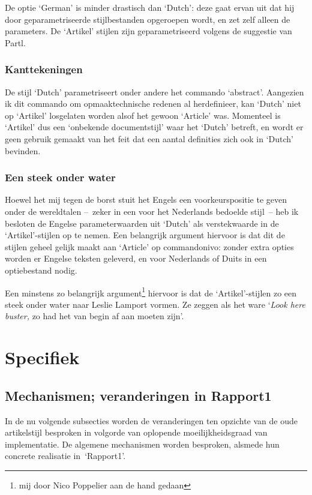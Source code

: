 \documentclass[oldtoc,a4paper,10pt]{rapport3}
\begin{document}
 
De optie `German' is minder drastisch dan `Dutch': deze gaat ervan uit
dat hij door geparametriseerde stijlbestanden opgeroepen wordt, en zet
zelf alleen de parameters.  De `Artikel' stijlen zijn geparametriseerd
volgens de suggestie van Partl.
 
\section{Kanttekeningen}
De stijl `Dutch' parametriseert onder andere het commando `abstract'.
Aangezien ik dit commando om opmaaktechnische redenen al herdefinieer,
kan `Dutch' niet op `Artikel' losgelaten worden alsof het gewoon
`Article' was. Momenteel is `Artikel' dus een `onbekende
documentstijl' waar het `Dutch' betreft, en wordt er geen gebruik
gemaakt van het feit dat een aantal definities zich ook in `Dutch'
bevinden.
 
\section{Een steek onder water}
Hoewel het mij tegen de borst stuit het Engels een voorkeurspositie te
geven onder de wereldtalen --~zeker in een voor het Nederlands
bedoelde stijl~-- heb ik besloten de Engelse parameterwaarden uit
`Dutch' als verstekwaarde in de `Artikel'-stijlen op te nemen. Een
belangrijk argument hiervoor is dat dit de stijlen geheel gelijk maakt
aan `Article' op commando\-nivo: zonder extra opties worden er Engelse
teksten geleverd, en voor Nederlands of Duits in een optiebestand
nodig.
 
Een minstens zo belangrijk argument\footnote{mij door Nico Poppelier
  aan de hand gedaan} hiervoor is dat de `Artikel'-stijlen zo een
steek onder water naar Leslie Lamport vormen. Ze zeggen als het ware
`\emph{Look here buster,} zo had het van begin af aan moeten zijn'.
 
 
\part{Specifiek}
 
\chapter{Mechanismen; veranderingen in Rapport1}
 
In de nu volgende subsecties worden de veranderingen ten opzichte van
de oude artikelstijl besproken in volgorde van oplopende
moeilijkheidsgraad van implementatie. De algemene mechanismen worden
besproken, alsmede hun concrete realisatie in~`Rapport1'.
 
\end{document}
